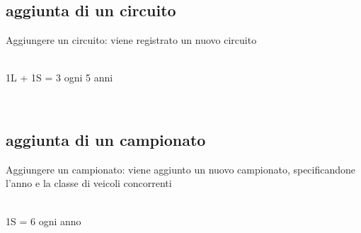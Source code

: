 \documentclass[a4paper,12pt]{report}
\begin{document}
			\subsection{aggiunta di un circuito}
			Aggiungere un circuito:
			viene registrato un nuovo circuito
			\begin{table}[!htb]
				\centering
				\begin{center}
				\newline\\
				1L + 1S = 3 ogni 5 anni\\
				\end{center}
			\end{table}\\
			\subsection{aggiunta di un campionato}
			Aggiungere un campionato:
			viene aggiunto un nuovo campionato, specificandone l'anno e la classe di veicoli concorrenti
			\begin{table}[!htb]
				\centering
				\begin{center}
				\newline\\
				1S = 6 ogni anno\\
				\end{center}
			\end{table}\\
\end{document}

